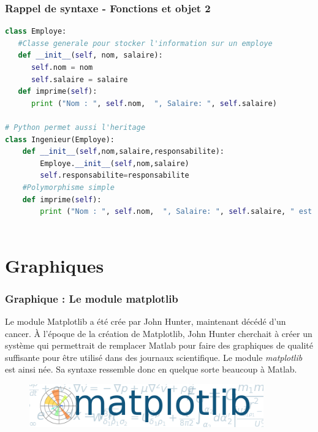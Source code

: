 \documentclass[]{beamer}
\begin{document}
\begin{frame}[fragile]
\frametitle{Rappel de syntaxe - Fonctions et objet 2 }

\begin{lstlisting}[language=Python]
class Employe:
   #Classe generale pour stocker l'information sur un employe
   def __init__(self, nom, salaire):
      self.nom = nom
      self.salaire = salaire
   def imprime(self):
      print ("Nom : ", self.nom,  ", Salaire: ", self.salaire)
 
# Python permet aussi l'heritage
class Ingenieur(Employe):
    def __init__(self,nom,salaire,responsabilite):
        Employe.__init__(self,nom,salaire)
        self.responsabilite=responsabilite
    #Polymorphisme simple
    def imprime(self):
        print ("Nom : ", self.nom,  ", Salaire: ", self.salaire, " est ingenieur responsable de ", self.responsabilite)
        

\end{lstlisting}
\end{frame}

\section{Graphiques}
\begin{frame}
\frametitle{Graphique : Le module matplotlib}
Le module Matplotlib a été crée par John Hunter, maintenant décédé d'un cancer. À l'époque de la création de Matplotlib, John Hunter cherchait à créer un système qui permettrait de remplacer Matlab pour faire des graphiques de qualité suffisante pour être utilisé dans des journaux scientifique. Le module \textit{matplotlib} est ainsi née. Sa syntaxe ressemble donc en quelque sorte beaucoup à Matlab.

\begin{figure}[!htpb]
        \centering
        \includegraphics[width=0.9\textwidth]{im/matplotliblogo}
        \label{fig::matplotliblogo}
\end{figure}
\end{frame}
\end{document}
